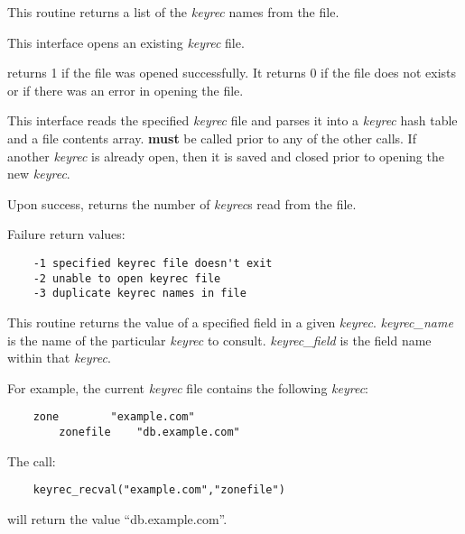 \begin{description}
This routine returns a list of the {\it keyrec} names from the file.

\item {}

This interface opens an existing {\it keyrec} file.

 returns 1 if the file was opened successfully.  It
returns 0 if the file does not exists or if there was an error in opening
the file.

\item {}

This interface reads the specified {\it keyrec} file and parses it into
a {\it keyrec} hash table and a file contents array.  
{\bf must} be called prior to any of the other
 calls.  If another {\it keyrec} is
already open, then it is saved and closed prior to opening the new {\it
keyrec}.

Upon success,  returns the number of {\it keyrec}s read
from the file.

Failure return values:

\begin{verbatim}
    -1 specified keyrec file doesn't exit
    -2 unable to open keyrec file
    -3 duplicate keyrec names in file
\end{verbatim}

\item {}

This routine returns the value of a specified field in a given {\it keyrec}.
{\it keyrec\_name} is the name of the particular {\it keyrec} to consult.
{\it keyrec\_field} is the field name within that {\it keyrec}.

For example, the current {\it keyrec} file contains the following {\it keyrec}:

\begin{verbatim}
    zone        "example.com"
        zonefile    "db.example.com"
\end{verbatim}

The call:

\begin{verbatim}
    keyrec_recval("example.com","zonefile")
\end{verbatim}

will return the value ``db.example.com''.

\item {}


\end{description}
